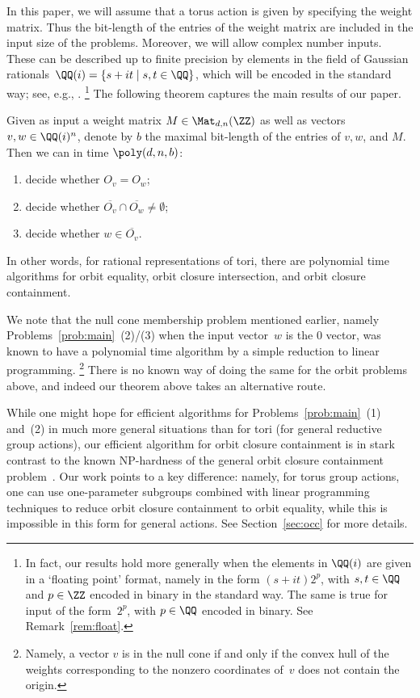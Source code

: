 In this paper, we will assume that a torus action is given by specifying the weight matrix.
Thus the bit-length of the entries of the weight matrix are included in the input size of the problems.
Moreover, we will allow complex number inputs.
These can be described up to finite precision by elements in the field of Gaussian rationals~$\QQ(i) = \{ s + i t \;|\; s,t \in \QQ \}$,
which will be encoded in the standard way; see, e.g., \cite{GCTV}.
\footnote{In fact, our results hold more generally when the elements in $\QQ(i)$ are given in a `floating point' format, namely in the form $(s + it) 2^p$, with $s,t\in\QQ$ and $p\in\ZZ$ encoded in binary in the standard way. The same is true for input of the form~$2^p$, with $p\in\QQ$ encoded in binary. See Remark~\ref{rem:float}.\label{foot:float}}
The following theorem captures the main results of our paper.

\begin{theorem}\label{thm:main}
Given as input a weight matrix $M \in\Mat_{d,n}(\ZZ)$ as well as vectors $v,w \in \QQ(i)^n$, denote by $b$ the maximal bit-length of the entries of $v,w$, and $M$.
Then we can in time $\poly(d,n,b)$:
\begin{enumerate}
\item decide whether $O_v = O_w$;
\item decide whether $\overline{O_v} \cap \overline{O_w} \ne \emptyset$;
\item decide whether $w \in \overline{O_v}$.
\end{enumerate}
In other words, for rational representations of tori, there are polynomial time algorithms for orbit equality, orbit closure intersection, and orbit closure containment.
\end{theorem}

We note that the null cone membership problem mentioned earlier, namely Problems~\ref{prob:main}~(2)/(3) when the input vector~$w$ is the $0$ vector,
was known to have a polynomial time algorithm by a simple reduction to linear programming.
\footnote{
Namely, a vector $v$ is in the null cone if and only if the convex hull of the weights corresponding to the nonzero coordinates of~$v$ does not contain the origin.}
There is no known way of doing the same for the orbit problems above, and indeed our theorem above takes an alternative route.

While one might hope for efficient algorithms for Problems~\ref{prob:main}~(1) and~(2) in much more general situations than for tori (for general reductive group actions), our efficient algorithm for orbit closure containment is in stark contrast to the known NP-hardness of the general orbit closure containment problem~\cite{BILPS:20}.
Our work points to a key difference: namely, for torus group actions, one can use one-parameter subgroups combined with linear programming techniques to reduce orbit closure containment to orbit equality, while this is impossible in this form for general actions.
See Section~\ref{sec:occ} for more details.

